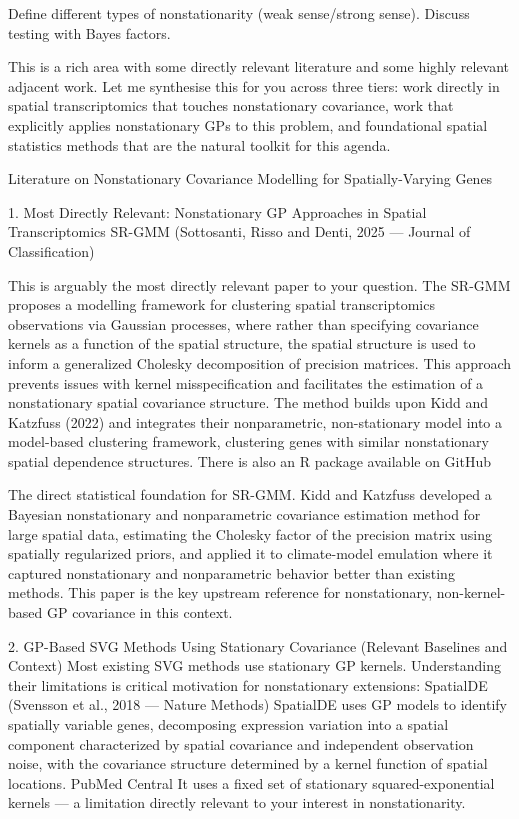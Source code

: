 \documentclass[pdflatex,sn-mathphys-num]{sn-jnl}%
\theoremstyle{thmstyleone}%
\theoremstyle{thmstyletwo}%
\theoremstyle{thmstylethree}%
\begin{document}
Define different types of nonstationarity (weak sense/strong sense). Discuss testing  with Bayes factors.

This is a rich area with some directly relevant literature and some highly relevant adjacent work. Let me synthesise this for you across three tiers: work directly in spatial transcriptomics that touches nonstationary covariance, work that explicitly applies nonstationary GPs to this problem, and foundational spatial statistics methods that are the natural toolkit for this agenda.

Literature on Nonstationary Covariance Modelling for Spatially-Varying Genes

1. Most Directly Relevant: Nonstationary GP Approaches in Spatial Transcriptomics
SR-GMM (Sottosanti, Risso and Denti, 2025 — Journal of Classification)

This is arguably the most directly relevant paper to your question. The SR-GMM proposes a modelling framework for clustering spatial transcriptomics observations via Gaussian processes, where rather than specifying covariance kernels as a function of the spatial structure, the spatial structure is used to inform a generalized Cholesky decomposition of precision matrices. This approach prevents issues with kernel misspecification and facilitates the estimation of a nonstationary spatial covariance structure. The method builds upon Kidd and Katzfuss (2022) and integrates their nonparametric, non-stationary model into a model-based clustering framework, clustering genes with similar nonstationary spatial dependence structures. There is also an R package available on GitHub

The direct statistical foundation for SR-GMM. Kidd and Katzfuss developed a Bayesian nonstationary and nonparametric covariance estimation method for large spatial data, estimating the Cholesky factor of the precision matrix using spatially regularized priors, and applied it to climate-model emulation where it captured nonstationary and nonparametric behavior better than existing methods. This paper is the key upstream reference for nonstationary, non-kernel-based GP covariance in this context.

2. GP-Based SVG Methods Using Stationary Covariance (Relevant Baselines and Context)
Most existing SVG methods use stationary GP kernels. Understanding their limitations is critical motivation for nonstationary extensions:
SpatialDE (Svensson et al., 2018 — Nature Methods)
SpatialDE uses GP models to identify spatially variable genes, decomposing expression variation into a spatial component characterized by spatial covariance and independent observation noise, with the covariance structure determined by a kernel function of spatial locations. PubMed Central It uses a fixed set of stationary squared-exponential kernels — a limitation directly relevant to your interest in nonstationarity.
\end{document}
